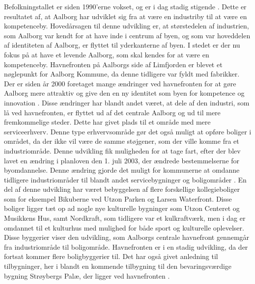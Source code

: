 \newline \indent{     }  Befolkningstallet er siden 1990'erne vokset, og er i dag stadig stigende \citep{indbyggertal}. Dette er resultatet af, at Aalborg har udviklet sig fra at være en industriby til at være en kompetenceby. Hovedårsagen til denne udvikling er, at størstedelen af industrien, som Aalborg var kendt for at have inde i centrum af byen, og som var hoveddelen af identiteten af Aalborg, er flyttet til yderkanterne af byen. I stedet er der nu fokus på at have et levende Aalborg, som skal kendes for at være en kompetenceby.
\newline \indent{     }  Havnefronten på Aalborgs side af Limfjorden er blevet et nøglepunkt for Aalborg Kommune, da denne tidligere var fyldt med fabrikker. Der er siden år 2000 foretaget mange ændringer ved havnefronten for at gøre Aalborg mere attraktiv og give den en ny identitet som byen for kompetence og innovation \citep{brughavnen}.
\newline \indent{     }  Disse ændringer har blandt andet været, at dele af den industri, som lå ved havnefronten, er flyttet ud af det centrale Aalborg og ud til mere fremkommelige steder. Dette har givet plads til et område med mere serviceerhverv. Denne type erhvervsområde gør det også muligt at opføre boliger i området, da der ikke vil være de samme støjgener, som der ville komme fra et industriområde. Denne udvikling fik muligheden for at tage fart, efter der blev lavet en ændring i planloven den 1. juli 2003, der ændrede bestemmelserne for byomdannelse. Denne ændring gjorde det muligt for kommunerne at omdanne tidligere industriområder til blandt andet servicebygninger og boligområder \citep{sort}.
En del af denne udvikling har været bebyggelsen af flere forskellige kollegieboliger som for eksempel Bikuberne ved Utzon Parken og Larsen Waterfront. Disse boliger ligger tæt op ad nogle nye kulturelle bygninger som Utzon Centeret og Musikkens Hus, samt Nordkraft, som tidligere var et kulkraftværk, men i dag er omdannet til et kulturhus med mulighed for både sport og kulturelle oplevelser. Disse byggerier viser den udvikling, som Aalborgs centrale havnefront gennemgår fra industriområde til boligområde. Havnefronten er i en stadig udvikling, da der fortsat kommer flere boligbyggerier til. Det har også givet anledning til tilbygninger, her i blandt en kommende tilbygning til den bevaringsværdige bygning Strøybergs Palæ, der ligger ved havnefronten \citep{havnefronterne}.

